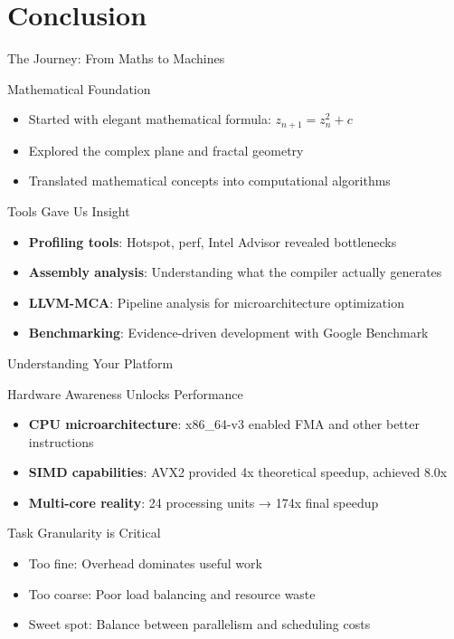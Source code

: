 \documentclass{beamer}
\begin{document}
\section{Conclusion}
\begin{frame}{The Journey: From Maths to Machines}
    \begin{block}{Mathematical Foundation}
        \begin{itemize}
            \item Started with elegant mathematical formula: $z_{n+1} = z_n^2 + c$
            \item Explored the complex plane and fractal geometry
            \item Translated mathematical concepts into computational algorithms
        \end{itemize}
    \end{block}
    
    \begin{block}{Tools Gave Us Insight}
        \begin{itemize}
            \item \textbf{Profiling tools}: Hotspot, perf, Intel Advisor revealed bottlenecks
            \item \textbf{Assembly analysis}: Understanding what the compiler actually generates
            \item \textbf{LLVM-MCA}: Pipeline analysis for microarchitecture optimization
            \item \textbf{Benchmarking}: Evidence-driven development with Google Benchmark
        \end{itemize}
    \end{block}
\end{frame}

\begin{frame}{Understanding Your Platform}
    \begin{block}{Hardware Awareness Unlocks Performance}
        \begin{itemize}
            \item \textbf{CPU microarchitecture}: x86\_64-v3 enabled FMA and other better instructions
            \item \textbf{SIMD capabilities}: AVX2 provided 4x theoretical speedup, achieved 8.0x
            \item \textbf{Multi-core reality}: 24 processing units → 174x final speedup
        \end{itemize}
    \end{block}
    
    \begin{block}{Task Granularity is Critical}
        \begin{itemize}
            \item Too fine: Overhead dominates useful work
            \item Too coarse: Poor load balancing and resource waste
            \item Sweet spot: Balance between parallelism and scheduling costs
        \end{itemize}
    \end{block}
\end{frame}
\end{document}
